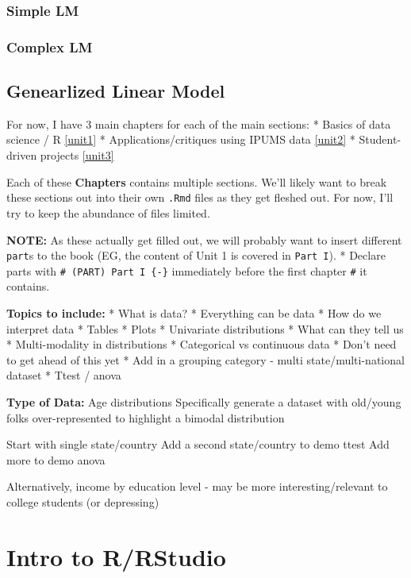 \documentclass[
]{book}
\begin{document}
\hypertarget{simple-lm}{%
\subsubsection{Simple LM}\label{simple-lm}}

\hypertarget{complex-lm}{%
\subsubsection{Complex LM}\label{complex-lm}}

\hypertarget{genearlized-linear-model}{%
\subsection{Genearlized Linear Model}\label{genearlized-linear-model}}

For now, I have 3 main chapters for each of the main sections:
* Basics of data science / R \ref{unit1}
* Applications/critiques using IPUMS data \ref{unit2}
* Student-driven projects \ref{unit3}

Each of these \textbf{Chapters} contains multiple sections. We'll likely want to break these sections out into their own \texttt{.Rmd} files as they get fleshed out. For now, I'll try to keep the abundance of files limited.

\textbf{NOTE:} As these actually get filled out, we will probably want to insert different \texttt{part}s to the book (EG, the content of Unit 1 is covered in \texttt{Part\ I}).
* Declare parts with \texttt{\#\ (PART)\ Part\ I\ \{-\}} immediately before the first chapter \texttt{\#} it contains.

\textbf{Topics to include:}
* What is data?
* Everything can be data
* How do we interpret data
* Tables
* Plots
* Univariate distributions
* What can they tell us
* Multi-modality in distributions
* Categorical vs continuous data
* Don't need to get ahead of this yet
* Add in a grouping category - multi state/multi-national dataset
* Ttest / anova

\textbf{Type of Data:}
Age distributions
Specifically generate a dataset with old/young folks over-represented to highlight a bimodal distribution

Start with single state/country
Add a second state/country to demo ttest
Add more to demo anova

Alternatively, income by education level - may be more interesting/relevant to college students (or depressing)

\hypertarget{intro-to-rrstudio}{%
\section{Intro to R/RStudio}\label{intro-to-rrstudio}}
\end{document}
